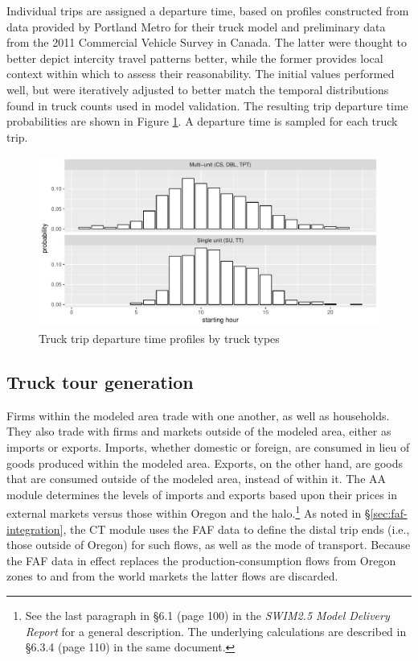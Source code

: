 Individual trips are assigned a departure time, based on profiles constructed from data provided by Portland Metro for their truck model and preliminary data from the 2011 Commercial Vehicle Survey in Canada. The latter were thought to better depict intercity travel patterns better, while the former provides local context within which to assess their reasonability. The initial values performed well, but were iteratively adjusted to better match the temporal distributions found in truck counts used in model validation. The resulting trip departure time probabilities are shown in Figure \ref{fig:ct-trip-departure-times}. A departure time is sampled for each truck trip.

\begin{figure}
\centering
\includegraphics[width=6.25in]{figures/trip-start-hour.pdf}
\caption{Truck trip departure time profiles by truck types}
\label{fig:ct-trip-departure-times}
\end{figure}

\subsection{Truck tour generation}\label{sec:ct-tour-generation}

Firms within the modeled area trade with one another, as well as households. They also trade with firms and markets outside of the modeled area, either as imports or exports. Imports, whether domestic or foreign, are consumed in lieu of goods produced within the modeled area. Exports, on the other hand, are goods that are consumed outside of the modeled area, instead of within it. The AA module determines the levels of imports and exports based upon their prices in external markets versus those within Oregon and the halo.\footnote{See the last paragraph in \S6.1 (page 100) in the \textit{SWIM2.5 Model Delivery Report} for a general description. The underlying calculations are described in \S6.3.4 (page 110) in the same document.} As noted in \S\ref{sec:faf-integration}, the CT module uses the FAF data to define the distal trip ends (i.e., those outside of Oregon) for such flows, as well as the mode of transport. Because the FAF data in effect replaces the production-consumption flows from Oregon zones to and from the world markets the latter flows are discarded. 

